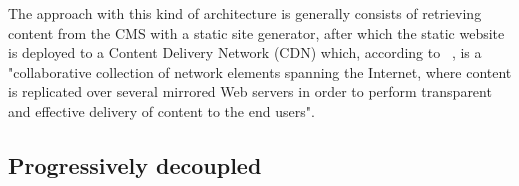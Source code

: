 The approach with this kind of architecture is generally consists of retrieving content from the CMS with a static site generator, after which the static website is deployed to a Content Delivery Network (CDN) which, according to ~\textcite{Buyya2008}, is a "collaborative collection of network elements spanning the Internet, where content is replicated over
several mirrored Web servers in order to perform transparent and effective delivery of content to the end users".

\subsection{Progressively decoupled}